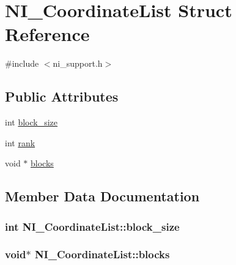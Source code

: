 \hypertarget{structNI__CoordinateList}{}\section{N\+I\+\_\+\+Coordinate\+List Struct Reference}
\label{structNI__CoordinateList}


{\ttfamily \#include $<$ni\+\_\+support.\+h$>$}

\subsection*{Public Attributes}
\begin{DoxyCompactItemize}
\item 
int \hyperlink{structNI__CoordinateList_a867954cac5c363dd47251575beaf6674}{block\+\_\+size}
\item 
int \hyperlink{structNI__CoordinateList_a7c118eb34bc25d4aee297037ebf13b94}{rank}
\item 
void $\ast$ \hyperlink{structNI__CoordinateList_a8b8193de936c501eb0ba16b9ac771ae9}{blocks}
\end{DoxyCompactItemize}


\subsection{Member Data Documentation}
\hypertarget{structNI__CoordinateList_a867954cac5c363dd47251575beaf6674}{}
\subsubsection[{block\+\_\+size}]{\setlength{\rightskip}{0pt plus 5cm}int N\+I\+\_\+\+Coordinate\+List\+::block\+\_\+size}\label{structNI__CoordinateList_a867954cac5c363dd47251575beaf6674}
\hypertarget{structNI__CoordinateList_a8b8193de936c501eb0ba16b9ac771ae9}{}
\subsubsection[{blocks}]{\setlength{\rightskip}{0pt plus 5cm}void$\ast$ N\+I\+\_\+\+Coordinate\+List\+::blocks}\label{structNI__CoordinateList_a8b8193de936c501eb0ba16b9ac771ae9}
\hypertarget{structNI__CoordinateList_a7c118eb34bc25d4aee297037ebf13b94}{}
